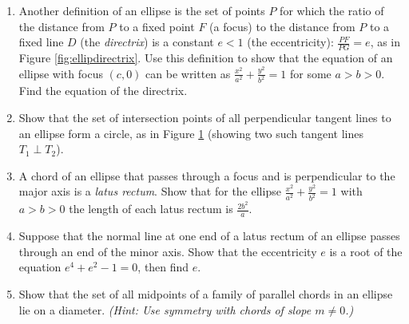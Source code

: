 {\begin{enumerate}[\bfseries 1.]
\begin{figure}[h]
\begin{minipage}[b]{5cm}
 \begin{center}
  \vspace{-4mm}
 \end{center}
 \caption[]{\enskip Exercise \ref{exer:ellipdircircle}}
 \label{fig:ellipdircircle}
\end{minipage}
\end{figure}\vspace{-3mm}
 \item\label{exer:ellipdirectrix} Another definition of an ellipse is the set of
  points $P$ for which the ratio of the distance from $P$ to a fixed point $F$
  (a focus) to the distance from $P$ to a fixed line $D$ (the
  \emph{directrix}) is a constant $e<1$ (the eccentricity):
  $\frac{PF}{PG}=e$, as in Figure \ref{fig:ellipdirectrix}. Use this definition
  to show that the equation of an ellipse with focus $(c,0)$ can be written as
  $\frac{x^2}{a^2} + \frac{y^2}{b^2} = 1$ for some $a>b>0$. Find the equation of
  the directrix.
 \item\label{exer:ellipdircircle} Show that the set of intersection points of
  all perpendicular tangent lines to an ellipse form a circle, as in Figure
  \ref{fig:ellipdircircle} (showing two such tangent lines $T_1 \perp T_2$).
 \item\label{exer:elliplatus} A chord of an ellipse that passes through a focus
  and is perpendicular to the major axis is a \emph{latus
  rectum}. Show that for the
  ellipse $\frac{x^2}{a^2} + \frac{y^2}{b^2} =1$ with $a>b>0$ the length of each
  latus rectum is $\frac{2b^2}{a}$.
 \item Suppose that the normal line at one end of a latus rectum of an ellipse
  passes through an end of the minor axis. Show that the eccentricity $e$ is a
  root of the equation $e^4 + e^2 - 1 = 0$, then find $e$.
 \item Show that the set of all midpoints of a family of parallel chords in an
  ellipse lie on a diameter. \emph{(Hint: Use symmetry with chords of slope
  $m \ne 0$.)}
\end{enumerate}
}
\newpage
